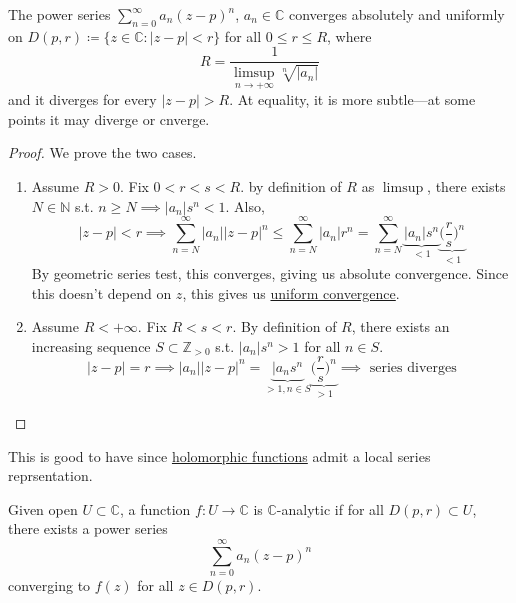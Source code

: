 	\begin{theorem}
	  \label{thm:cauchy-1821-hadamard-1888}
		The power series $\sum_{n=0}^\infty a_n (z - p)^n$, $a_n \in \mathbb{C}$ converges absolutely and uniformly on $D(p, r) \coloneqq \{z \in \mathbb{C} \colon |z - p| < r \}$ for all $0 \leq r \leq R$, where 
		\begin{equation}
			R = \frac{1}{\limsup_{n \to +\infty} \sqrt[n]{|a_n|}}
		\end{equation}
		and it diverges for every $|z - p| > R$. At equality, it is more subtle---at some points it may diverge or cnverge. 
	\end{theorem}
	\begin{proof}
		We prove the two cases. 
		\begin{enumerate}
		  \item Assume $R > 0$. Fix $0 < r < s < R$. by definition of $R$ as $\limsup$, there exists $N \in \mathbb{N}$ s.t. $n \geq N \implies |a_n| s^n < 1$. Also, 
				\begin{equation}
					|z - p| < r \implies \sum_{n = N}^\infty |a_n| |z - p|^n \leq \sum_{n=N}^\infty |a_n| r^n = \sum_{n=N}^\infty \underbrace{|a_n| s^n}_{<1} \underbrace{\bigg( \frac{r}{s} \bigg)^n}_{<1}
				\end{equation}
				By geometric series test, this converges, giving us absolute convergence. Since this doesn't depend on $z$, this gives us \hyperref[real-def:uniform-convergence]{uniform convergence}. 

			\item Assume $R < +\infty$. Fix $R < s < r$. By definition of $R$, there exists an increasing sequence $S \subset \mathbb{Z}_{>0}$ s.t. $|a_n| s^n > 1$ for all $n \in S$. 
				\begin{equation}
					|z - p| = r \implies |a_n| |z - p|^n = \underbrace{|a_n s^n}_{> 1, n \in S} \underbrace{\bigg(\frac{r}{s} \bigg)^n }_{>1} \implies \text{ series diverges}
				\end{equation}
		\end{enumerate}
	\end{proof}

	This is good to have since \hyperref[def:holomorphic-function-2]{holomorphic functions} admit a local series reprsentation. 

	\begin{definition}
	  \label{def:complex-analytic}
		Given open $U \subset \mathbb{C}$, a function $f: U \to \mathbb{C}$ is $\mathbb{C}$-analytic if for all $D(p, r) \subset U$, there exists a power series 
		\begin{equation}
			\sum_{n=0}^\infty a_n (z - p)^n 
		\end{equation}
		converging to $f(z)$ for all $z \in D(p, r)$. 
	\end{definition}

